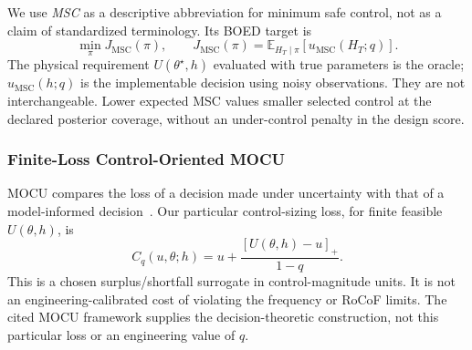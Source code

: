 \documentclass[journal]{IEEEtran}
\newcommand{\E}{\mathbb{E}}
\begin{document}
We use \emph{MSC} as a descriptive abbreviation for minimum safe control,
not as a claim of standardized terminology. Its BOED target is
\begin{equation}
\min_\pi J_{\mathrm{MSC}}(\pi),\qquad
J_{\mathrm{MSC}}(\pi)=\E_{H_T\mid\pi}[u_{\mathrm{MSC}}(H_T;q)].
\label{eq:msc-objective}
\end{equation}
The physical requirement $U(\theta^\star,h)$ evaluated with true parameters
is the oracle; $u_{\mathrm{MSC}}(h;q)$ is the implementable decision using
noisy observations. They are not interchangeable. Lower expected MSC values
smaller selected control at the declared posterior coverage, without an
under-control penalty in the design score.

\subsubsection{Finite-Loss Control-Oriented MOCU}
MOCU compares the loss of a decision made under uncertainty with that of a
model-informed decision~\cite{yoon2013mocu,boluki2018generalized}.
Our particular control-sizing loss, for finite feasible $U(\theta,h)$, is
\begin{equation}
C_q(u,\theta;h)=u+\frac{[U(\theta,h)-u]_+}{1-q}.
\label{eq:operational_cost}
\end{equation}
This is a chosen surplus/shortfall surrogate in control-magnitude units.
It is not an engineering-calibrated cost of violating the frequency or RoCoF
limits. The cited MOCU framework supplies the decision-theoretic construction,
not this particular loss or an engineering value of $q$.
\end{document}
